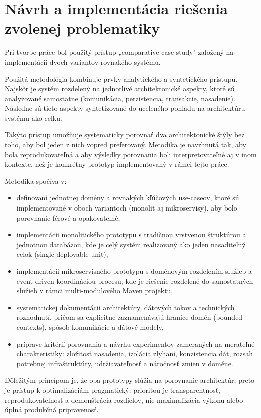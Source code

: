 \chapter{Návrh a implementácia riešenia zvolenej problematiky}\label{ch:design-implementation}

Pri tvorbe práce bol použitý prístup „comparative case study" založený na implementácii dvoch variantov rovnakého systému.

Použitá metodológia kombinuje prvky analytického a syntetického prístupu. Najskôr je systém rozdelený na jednotlivé architektonické aspekty, ktoré sú analyzované samostatne (komunikácia, perzistencia, transakcie, nasadenie). Následne sú tieto aspekty syntetizované do uceleného pohľadu na architektúru systému ako celku.

Takýto prístup umožňuje systematicky porovnať dva architektonické štýly bez toho, aby bol jeden z nich vopred preferovaný. Metodika je navrhnutá tak, aby bola reprodukovateľná a aby výsledky porovnania boli interpretovateľné aj v inom kontexte, než je konkrétny prototyp implementovaný v rámci tejto práce.

Metodika spočíva v:
\begin{itemize}
    \item definovaní jednotnej domény a rovnakých kľúčových use-caseov, ktoré sú implementované v oboch variantoch (monolit aj mikroservisy), aby bolo porovnanie férové a opakovateľné,
    \item implementácii monolitického prototypu s tradičnou vrstvenou štruktúrou a jednotnou databázou, kde je celý systém realizovaný ako jeden nasaditeľný celok (single deployable unit),
    \item implementácii mikroservisného prototypu s doménovým rozdelením služieb a event-driven koordináciou procesu, kde je riešenie rozdelené do samostatných služieb v rámci multi-modulového Maven projektu,
    \item systematickej dokumentácii architektúry, dátových tokov a technických rozhodnutí, pričom sa explicitne zaznamenávajú hranice domén (bounded contexts), spôsob komunikácie a dátové modely,
    \item príprave kritérií porovnania a návrhu experimentov zameraných na merateľné charakteristiky: zložitosť nasadenia, izolácia zlyhaní, konzistencia dát, rozsah potrebnej infraštruktúry, udržiavateľnosť a náročnosť zmien v doméne.
\end{itemize}

Dôležitým princípom je, že oba prototypy slúžia na porovnanie architektúr, preto je prístup k optimalizáciám pragmatický: prioritou je transparentnosť, reprodukovateľnosť a demonštrácia rozdielov, nie maximalizácia výkonu alebo úplná produkčná pripravenosť.

